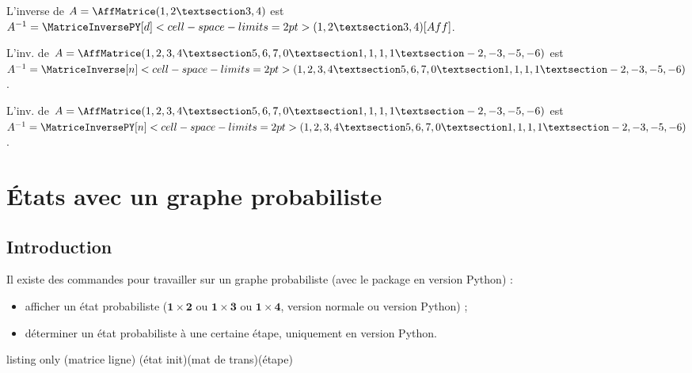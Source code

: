 \documentclass[french,a4paper,11pt]{article}
\newcommand\cmaj[1]{\tcbox[vignetteMaJ]{#1}\xspace}
\begin{document}
\begin{PresentationCode}{}
L'inverse de $A=\AffMatrice(1,2 § 3,4)$ est
$A^{-1}=\MatriceInversePY[d]<cell-space-limits=2pt>(1,2 § 3,4)[Aff]$.
\end{PresentationCode}

\begin{PresentationCode}{}
L'inv. de $A=\AffMatrice(1,2,3,4 § 5,6,7,0 § 1,1,1,1 § -2,-3,-5,-6)$ est
$A^{-1}=
\MatriceInverse[n]<cell-space-limits=2pt>(1,2,3,4 § 5,6,7,0 § 1,1,1,1 § -2,-3,-5,-6)$.
\end{PresentationCode}

\begin{PresentationCode}{}
L'inv. de $A=\AffMatrice(1,2,3,4 § 5,6,7,0 § 1,1,1,1 § -2,-3,-5,-6)$ est
$A^{-1}=
\MatriceInversePY[n]<cell-space-limits=2pt>(1,2,3,4 § 5,6,7,0 § 1,1,1,1 § -2,-3,-5,-6)$.
\end{PresentationCode}

\pagebreak

\section{États avec un graphe probabiliste}

\subsection{Introduction}

\begin{cautionblock}
\cmaj{0.1.4} Il existe des commandes pour travailler sur un graphe probabiliste (avec le package en version \textsf{Python}) :

\begin{itemize}
	\item afficher un état probabiliste ($\mathbf{1\times2}$ ou $\mathbf{1\times3}$ ou $\mathbf{1\times4}$, version normale ou version \textsf{Python}) ;
	\item déterminer un état probabiliste à une certaine étape, uniquement en version \textsf{Python}.
\end{itemize}
\vspace*{-\baselineskip}\leavevmode
\end{cautionblock}

\begin{PresentationCode}{listing only}
(matrice ligne)
(état init)(mat de trans)(étape)
\end{PresentationCode}
\end{document}
